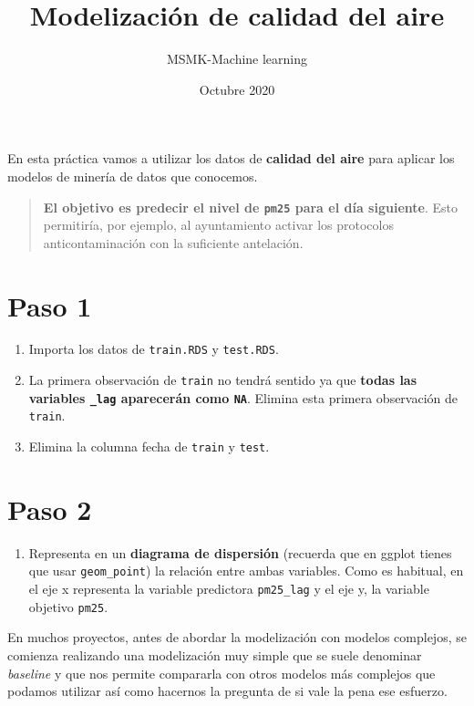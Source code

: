 \documentclass[
]{article}
\title{Modelización de calidad del aire}
\subtitle{MSMK-Machine learning}
\author{}
\date{\vspace{-2.5em}Octubre 2020}
\providecommand{\tightlist}{%
  \setlength{\itemsep}{0pt}\setlength{\parskip}{0pt}}
\begin{document}
\maketitle

En esta práctica vamos a utilizar los datos de \textbf{calidad del aire}
para aplicar los modelos de minería de datos que conocemos.

\begin{quote}
\textbf{El objetivo es predecir el nivel de \texttt{pm25} para el día
siguiente}. Esto permitiría, por ejemplo, al ayuntamiento activar los
protocolos anticontaminación con la suficiente antelación.
\end{quote}

\hypertarget{paso-1}{%
\section{Paso 1}\label{paso-1}}

\begin{enumerate}
\def\labelenumi{\arabic{enumi}.}
\tightlist
\item
  Importa los datos de \texttt{train.RDS} y \texttt{test.RDS}.
\item
  La primera observación de \texttt{train} no tendrá sentido ya que
  \textbf{todas las variables \texttt{\_lag} aparecerán como
  \texttt{NA}}. Elimina esta primera observación de \texttt{train}.
\item
  Elimina la columna fecha de \texttt{train} y \texttt{test}.
\end{enumerate}

\hypertarget{paso-2}{%
\section{Paso 2}\label{paso-2}}

\begin{enumerate}
\def\labelenumi{\arabic{enumi}.}
\tightlist
\item
  Representa en un \textbf{diagrama de dispersión} (recuerda que en
  ggplot tienes que usar \texttt{geom\_point}) la relación entre ambas
  variables. Como es habitual, en el eje x representa la variable
  predictora \texttt{pm25\_lag} y el eje y, la variable objetivo
  \texttt{pm25}.
\end{enumerate}

En muchos proyectos, antes de abordar la modelización con modelos
complejos, se comienza realizando una modelización muy simple que se
suele denominar \emph{baseline} y que nos permite compararla con otros
modelos más complejos que podamos utilizar así como hacernos la pregunta
de si vale la pena ese esfuerzo.
\end{document}
